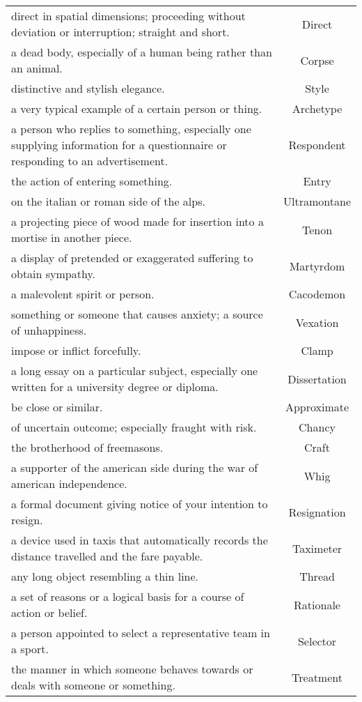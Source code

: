 \documentclass{article}
\begin{document}
\begin{longtable}{p{12cm}c}
direct in spatial dimensions; proceeding without deviation or interruption; straight and short. & Direct\\
a dead body, especially of a human being rather than an animal. & Corpse\\
distinctive and stylish elegance. & Style\\
a very typical example of a certain person or thing. & Archetype\\
a person who replies to something, especially one supplying information for a questionnaire or responding to an advertisement. & Respondent\\
the action of entering something. & Entry\\
on the italian or roman side of the alps. & Ultramontane\\
a projecting piece of wood made for insertion into a mortise in another piece. & Tenon\\
a display of pretended or exaggerated suffering to obtain sympathy. & Martyrdom\\
a malevolent spirit or person. & Cacodemon\\
something or someone that causes anxiety; a source of unhappiness. & Vexation\\
impose or inflict forcefully. & Clamp\\
a long essay on a particular subject, especially one written for a university degree or diploma. & Dissertation\\
be close or similar. & Approximate\\
of uncertain outcome; especially fraught with risk. & Chancy\\
the brotherhood of freemasons. & Craft\\
a supporter of the american side during the war of american independence. & Whig\\
a formal document giving notice of your intention to resign. & Resignation\\
a device used in taxis that automatically records the distance travelled and the fare payable. & Taximeter\\
any long object resembling a thin line. & Thread\\
a set of reasons or a logical basis for a course of action or belief. & Rationale\\
a person appointed to select a representative team in a sport. & Selector\\
the manner in which someone behaves towards or deals with someone or something. & Treatment\\

\end{longtable}
\end{document}
